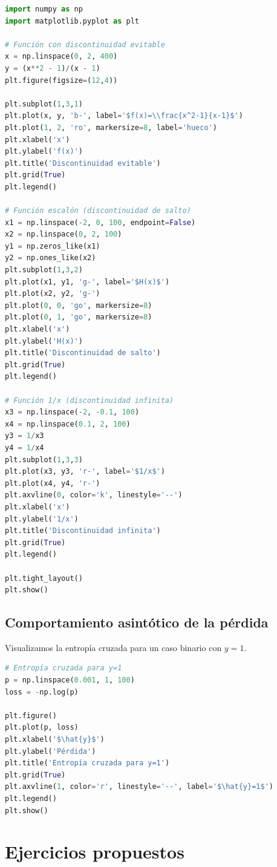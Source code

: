 \documentclass[12pt,a4paper,openany,oneside]{book}
\begin{document}
\begin{lstlisting}[language=Python]
import numpy as np
import matplotlib.pyplot as plt

# Función con discontinuidad evitable
x = np.linspace(0, 2, 400)
y = (x**2 - 1)/(x - 1)
plt.figure(figsize=(12,4))

plt.subplot(1,3,1)
plt.plot(x, y, 'b-', label='$f(x)=\\frac{x^2-1}{x-1}$')
plt.plot(1, 2, 'ro', markersize=8, label='hueco')
plt.xlabel('x')
plt.ylabel('f(x)')
plt.title('Discontinuidad evitable')
plt.grid(True)
plt.legend()

# Función escalón (discontinuidad de salto)
x1 = np.linspace(-2, 0, 100, endpoint=False)
x2 = np.linspace(0, 2, 100)
y1 = np.zeros_like(x1)
y2 = np.ones_like(x2)
plt.subplot(1,3,2)
plt.plot(x1, y1, 'g-', label='$H(x)$')
plt.plot(x2, y2, 'g-')
plt.plot(0, 0, 'go', markersize=8)
plt.plot(0, 1, 'go', markersize=8)
plt.xlabel('x')
plt.ylabel('H(x)')
plt.title('Discontinuidad de salto')
plt.grid(True)
plt.legend()

# Función 1/x (discontinuidad infinita)
x3 = np.linspace(-2, -0.1, 100)
x4 = np.linspace(0.1, 2, 100)
y3 = 1/x3
y4 = 1/x4
plt.subplot(1,3,3)
plt.plot(x3, y3, 'r-', label='$1/x$')
plt.plot(x4, y4, 'r-')
plt.axvline(0, color='k', linestyle='--')
plt.xlabel('x')
plt.ylabel('1/x')
plt.title('Discontinuidad infinita')
plt.grid(True)
plt.legend()

plt.tight_layout()
plt.show()
\end{lstlisting}

\subsection{Comportamiento asintótico de la pérdida}
Visualizamos la entropía cruzada para un caso binario con $y=1$.

\begin{lstlisting}[language=Python]
# Entropía cruzada para y=1
p = np.linspace(0.001, 1, 100)
loss = -np.log(p)

plt.figure()
plt.plot(p, loss)
plt.xlabel('$\hat{y}$')
plt.ylabel('Pérdida')
plt.title('Entropía cruzada para y=1')
plt.grid(True)
plt.axvline(1, color='r', linestyle='--', label='$\hat{y}=1$')
plt.legend()
plt.show()
\end{lstlisting}

\section{Ejercicios propuestos}
\end{document}
